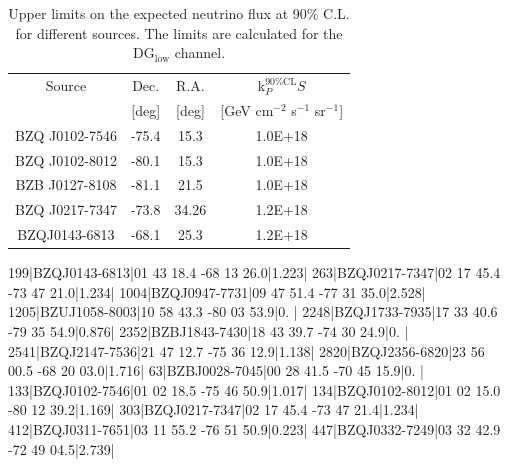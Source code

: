 \begin{table}
  \centering
  \begin{tabular}{|c|c|c|c|}
    \hline
    Source & Dec. & R.A. & k$^{\text{90\%CL}}_PS$ \\
    & [deg] & [deg] & [GeV cm$^{-2}$ s$^{-1}$ sr$^{-1}$] \\
    \hline
    BZQ J0102-7546 & -75.4 & 15.3 & 1.0E+18 \\
    BZQ J0102-8012 & -80.1 & 15.3 & 1.0E+18  \\
    BZB J0127-8108 & -81.1 & 21.5 & 1.0E+18 \\
    BZQ J0217-7347 & -73.8 & 34.26 & 1.2E+18 \\
    BZQJ0143-6813 & -68.1 & 25.3 & 1.2E+18 \\
    \hline
  \end{tabular}
  \caption{Upper limits on the expected neutrino flux at 90\% C.L. for different sources. The limits are calculated for the DG$_{\text{low}}$ channel.}
  \label{tab:source_limits}
\end{table}


199|BZQJ0143-6813|01 43 18.4 -68 13 26.0|1.223|
263|BZQJ0217-7347|02 17 45.4 -73 47 21.0|1.234|
1004|BZQJ0947-7731|09 47 51.4 -77 31 35.0|2.528|
1205|BZUJ1058-8003|10 58 43.3 -80 03 53.9|0.   |
2248|BZQJ1733-7935|17 33 40.6 -79 35 54.9|0.876|
2352|BZBJ1843-7430|18 43 39.7 -74 30 24.9|0.   |
2541|BZQJ2147-7536|21 47 12.7 -75 36 12.9|1.138|
2820|BZQJ2356-6820|23 56 00.5 -68 20 03.0|1.716|
63|BZBJ0028-7045|00 28 41.5 -70 45 15.9|0.   |  
133|BZQJ0102-7546|01 02 18.5 -75 46 50.9|1.017|  
134|BZQJ0102-8012|01 02 15.0 -80 12 39.2|1.169|  
303|BZQJ0217-7347|02 17 45.4 -73 47 21.4|1.234|  
412|BZQJ0311-7651|03 11 55.2 -76 51 50.9|0.223|  
447|BZQJ0332-7249|03 32 42.9 -72 49 04.5|2.739|  

